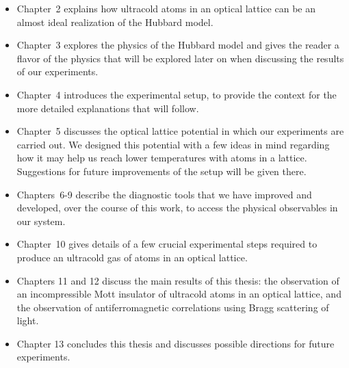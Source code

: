 \begin{itemize}

\item Chapter~2 explains how ultracold atoms in an optical lattice can be an
almost ideal realization of the Hubbard model.   

\item Chapter~3 explores the
physics of the Hubbard model and gives the reader a flavor of the physics that
will be explored later on when discussing the results of our experiments. 

\item Chapter~4 introduces the experimental setup, to provide the context for the more detailed explanations that will follow.   

\item Chapter~5 discusses the optical lattice potential in which our
experiments are carried out.  We designed this potential with a few ideas in
mind regarding how it may help us reach lower temperatures with atoms in a
lattice.   Suggestions for future improvements of the setup will be given there.   

\item Chapters~6-9 describe the diagnostic tools that we have improved and
developed, over the course of this work, to access the physical observables in
our system.  

\item Chapter~10 gives details of a few crucial experimental steps required to
produce an ultracold gas of atoms in an optical lattice. 

\item Chapters 11 and
12 discuss the main results of this thesis:  the observation of an
incompressible Mott insulator of ultracold atoms in an optical lattice, and the
observation of antiferromagnetic correlations using Bragg scattering of light.

\item Chapter 13 concludes this thesis and discusses possible directions for
future experiments.  

\end{itemize}






